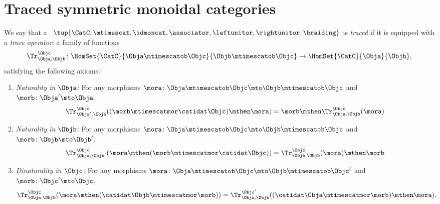 
\section{Traced symmetric monoidal categories}




\begin{ctdefinition}
    \label{def:traced-monoidal-cat}
    \label{def:traced-monoidal-category}
    We say that a ~$\tup{\CatC, \mtimescat, \idmoncat, \associator, \leftunitor, \rightunitor, \braiding}$ is \emph{traced} if it is equipped with a \emph{trace operator}: a family of functions
    \begin{equation}
        \Tr_{\Obja,\Objb}^\Objc\colon \HomSet{\CatC}{\Obja \mtimescatob \Objc}{\Objb\mtimescatob \Objc}\to \HomSet{\CatC}{\Obja}{\Objb},
    \end{equation}
    satisfying the following axioms:
    \begin{enumerate}
        \item \emph{Naturality in $\Obja$:} For any morphisms $\mora\colon \Obja\mtimescatob \Objc \mto \Objb\mtimescatob \Objc$ and $\morb \colon \Obja' \mto \Obja$,
              \begin{equation}\label{eq:trace-naturality-1}
                  \Tr_{\Obja', \Objb}^\Objc ( (\morb \mtimescatmor \catidat\Objc) \mthen \mora) = \morb \mthen \Tr_{\Obja, \Objb}^\Objc (\mora)
              \end{equation}
        \item \emph{Naturality in $\Objb$:} For any morphisms $\mora\colon \Obja\mtimescatob \Objc \mto \Objb\mtimescatob \Objc$ and $\morb \colon \Objb \mto \Objb'$,
              \begin{equation}\label{eq:trace-naturality-2}
                  \Tr_{\Obja, \Objb'}^\Objc ( \mora \mthen (\morb \mtimescatmor \catidat\Objc) ) = \Tr_{\Obja, \Objb}^\Objc (\mora) \mthen \morb
              \end{equation}
        \item \emph{Dinaturality in $\Objc$:}
              For any morphisms $\mora \colon \Obja  \mtimescatob \Objc \mto \Objb \mtimescatob \Objc'$ and $\morb \colon \Objc' \mto \Objc$,
              \begin{equation}\label{eq:trace-dinaturality}
                  \Tr_{\Obja, \Objb}^{\Objc} (\mora \mthen (\catidat\Objb \mtimescatmor \morb)) = \Tr_{\Obja, \Objb}^{\Objc'}((\catidat\Obja \mtimescatmor \morb) \mthen \mora).
              \end{equation}


\end{enumerate}
\end{ctdefinition}
